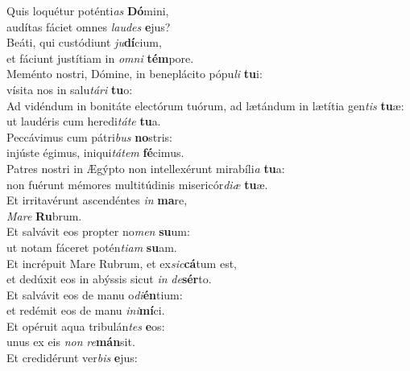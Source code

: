 \evenverse Quis loquétur poténti\textit{as} \textbf{Dó}mini,~\*\\
\evenverse audítas fáciet omnes \textit{lau}\textit{des} \textbf{e}jus?\\
\oddverse Beáti, qui custódiunt \textit{ju}\textbf{dí}cium,~\*\\
\oddverse et fáciunt justítiam in \textit{om}\textit{ni} \textbf{tém}pore.\\
\evenverse Meménto nostri, Dómine, in beneplácito pópu\textit{li} \textbf{tu}i:~\*\\
\evenverse vísita nos in salu\textit{tá}\textit{ri} \textbf{tu}o:\\
\oddverse Ad vidéndum in bonitáte electórum tuórum, ad lætándum in lætítia gen\textit{tis} \textbf{tu}æ:~\*\\
\oddverse ut laudéris cum heredi\textit{tá}\textit{te} \textbf{tu}a.\\
\evenverse Peccávimus cum pátri\textit{bus} \textbf{no}stris:~\*\\
\evenverse injúste égimus, iniqui\textit{tá}\textit{tem} \textbf{fé}cimus.\\
\oddverse Patres nostri in Ægýpto non intellexérunt mirabíli\textit{a} \textbf{tu}a:~\*\\
\oddverse non fuérunt mémores multitúdinis misericór\textit{di}\textit{æ} \textbf{tu}æ.\\
\evenverse Et irritavérunt ascendéntes \textit{in} \textbf{ma}re,~\*\\
\evenverse \textit{Ma}\textit{re} \textbf{Ru}brum.\\
\oddverse Et salvávit eos propter no\textit{men} \textbf{su}um:~\*\\
\oddverse ut notam fáceret potén\textit{ti}\textit{am} \textbf{su}am.\\
\evenverse Et incrépuit Mare Rubrum, et ex\textit{sic}\textbf{cá}tum est,~\*\\
\evenverse et dedúxit eos in abýssis sicut \textit{in} \textit{de}\textbf{sér}to.\\
\oddverse Et salvávit eos de manu o\textit{di}\textbf{én}tium:~\*\\
\oddverse et redémit eos de manu \textit{i}\textit{ni}\textbf{mí}ci.\\
\evenverse Et opéruit aqua tribulán\textit{tes} \textbf{e}os:~\*\\
\evenverse unus ex eis \textit{non} \textit{re}\textbf{mán}sit.\\
\oddverse Et credidérunt ver\textit{bis} \textbf{e}jus:~\*\\
